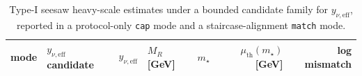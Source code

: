 %

\begin{table}[t]
\centering
\scriptsize
\setlength{\tabcolsep}{6pt}
\renewcommand{\arraystretch}{1.15}
\begin{tabular}{llllrrr}
\toprule
mode & $y_{\nu,\mathrm{eff}}$ candidate & $y_{\nu,\mathrm{eff}}$ & $M_R$ [GeV] & $m_\star$ & $\mu_{\mathrm{th}}(m_\star)$ [GeV] & log mismatch \\
\midrule
%
\end{tabular}
\caption{Type-I seesaw heavy-scale estimates under a bounded candidate family for $y_{\nu,\mathrm{eff}}$, reported in a protocol-only \texttt{cap} mode and a staircase-alignment \texttt{match} mode.}
\label{tab:neutrino_seesaw_scale}
\end{table}

